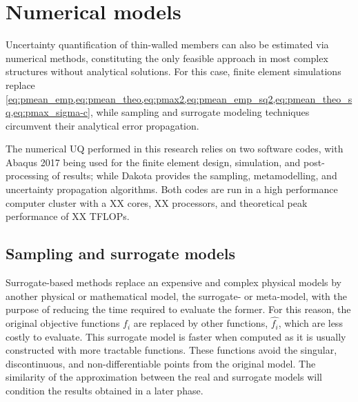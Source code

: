 \documentclass[12pt,number,preprint,review,times]{elsarticle}
\begin{document}
\section{Numerical models}

Uncertainty quantification of thin-walled members can also be estimated via numerical methods, constituting the only feasible approach in most complex structures without analytical solutions. For this case, finite element simulations replace \cref{eq:pmean_emp,eq:pmean_theo,eq:pmax2,eq:pmean_emp_sq2,eq:pmean_theo_sq,eq:pmax_sigma-c}, while sampling and surrogate modeling techniques circumvent their analytical error propagation. 

The numerical UQ performed in this research relies on two software codes, with Abaqus 2017 \citep{Ab2017} being used for the finite element design, simulation, and post-processing of results; while Dakota \citep{DaReference} provides the sampling, metamodelling, and uncertainty propagation algorithms. Both codes are run in a high performance computer cluster with a XX cores, XX processors, and theoretical peak performance of XX TFLOPs. 

\subsection{Sampling and surrogate models}

Surrogate-based methods replace an expensive and complex physical models by another physical or mathematical model, the surrogate- or meta-model, with the purpose of reducing the time required to evaluate the former. For this reason, the original objective functions $f_i$ are replaced by other functions, $\hat{f_i}$, which are less costly to evaluate.  This surrogate model is faster when computed as it is usually constructed with more tractable functions. These functions avoid the singular, discontinuous, and non-differentiable points from the original model. The similarity of the approximation between the real and surrogate models will condition the results obtained in a later phase.

\end{document}
